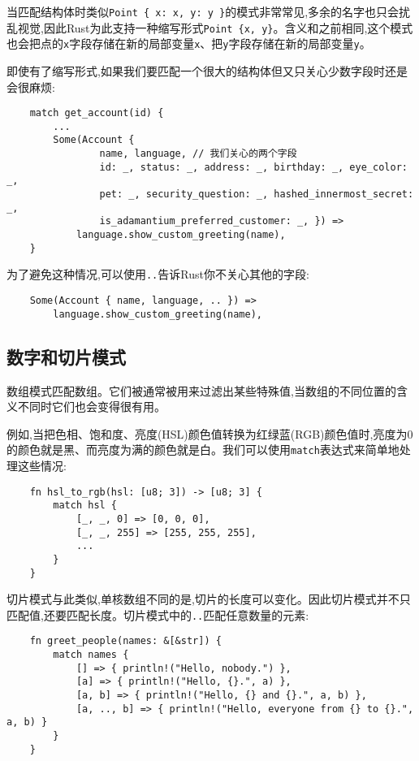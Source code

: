 当匹配结构体时类似\texttt{Point \{ x: x, y: y \}}的模式非常常见,多余的名字也只会扰乱视觉,因此Rust为此支持一种缩写形式\texttt{Point \{x, y\}}。含义和之前相同,这个模式也会把点的\texttt{x}字段存储在新的局部变量\texttt{x}、把\texttt{y}字段存储在新的局部变量\texttt{y}。

即使有了缩写形式,如果我们要匹配一个很大的结构体但又只关心少数字段时还是会很麻烦:
\begin{verbatim}
    match get_account(id) {
        ...
        Some(Account {
                name, language, // 我们关心的两个字段
                id: _, status: _, address: _, birthday: _, eye_color: _,
                pet: _, security_question: _, hashed_innermost_secret: _,
                is_adamantium_preferred_customer: _, }) =>
            language.show_custom_greeting(name),
    }
\end{verbatim}

为了避免这种情况,可以使用\texttt{..}告诉Rust你不关心其他的字段:
\begin{verbatim}
    Some(Account { name, language, .. }) =>
        language.show_custom_greeting(name),
\end{verbatim}

\subsection{数字和切片模式}
数组模式匹配数组。它们被通常被用来过滤出某些特殊值,当数组的不同位置的含义不同时它们也会变得很有用。

例如,当把色相、饱和度、亮度(HSL)颜色值转换为红绿蓝(RGB)颜色值时,亮度为0的颜色就是黑、而亮度为满的颜色就是白。我们可以使用\texttt{match}表达式来简单地处理这些情况:
\begin{verbatim}
    fn hsl_to_rgb(hsl: [u8; 3]) -> [u8; 3] {
        match hsl {
            [_, _, 0] => [0, 0, 0],
            [_, _, 255] => [255, 255, 255],
            ...
        }
    }
\end{verbatim}

切片模式与此类似,单核数组不同的是,切片的长度可以变化。因此切片模式并不只匹配值,还要匹配长度。切片模式中的\texttt{..}匹配任意数量的元素:
\begin{verbatim}
    fn greet_people(names: &[&str]) {
        match names {
            [] => { println!("Hello, nobody.") },
            [a] => { println!("Hello, {}.", a) },
            [a, b] => { println!("Hello, {} and {}.", a, b) },
            [a, .., b] => { println!("Hello, everyone from {} to {}.", a, b) }
        }
    }
\end{verbatim}

